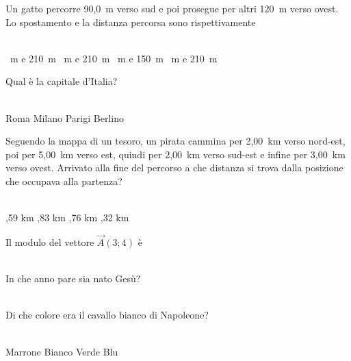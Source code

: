 \documentclass[a4paper,11pt]{exam}
\begin{document}
        \begin{center} 
        \end{center}
\begin{questions}

    
\question Un gatto percorre 90,0~m verso sud e poi prosegue per altri 120~m verso ovest. Lo spostamento e la distanza percorsa sono rispettivamente\\\
\begin{oneparchoices}
  ~m e 210~m
  ~m e 210~m
  ~m e 150~m
  \choice 210~m e 210~m
\end{oneparchoices}

    
\question Qual è la capitale d’Italia?\\\
\begin{oneparchoices}
  \choice Roma
  \choice Milano
  \choice Parigi
  \choice Berlino
\end{oneparchoices}

    
\question Seguendo la mappa di un tesoro, un pirata cammina per 2,00~km verso nord-est, poi per 5,00~km verso est, quindi per 2,00~km verso sud-est e infine per 3,00~km verso ovest. Arrivato alla fine del percorso a che distanza si trova dalla posizione che occupava alla partenza?\\\
\begin{oneparchoices}
  ,59 km
  \choice 4,83 km
  \choice 4,76 km
  ,32 km
\end{oneparchoices}

    
\question Il modulo del vettore $\vec{A}(3;4)$ è\\\
\begin{oneparchoices}
  \choice 25
  \choice 5
  \choice 8
\end{oneparchoices}

    
\question In che anno pare sia nato Gesù?\\\
\begin{oneparchoices}
  \choice 0
  \choice -80
  \choice 2019
  \choice 20
\end{oneparchoices}

    
\question Di che colore era il cavallo bianco di Napoleone?\\\
\begin{oneparchoices}
  \choice Marrone
  \choice Bianco
  \choice Verde
  \choice Blu 
\end{oneparchoices}


\end{questions}
\end{document}

